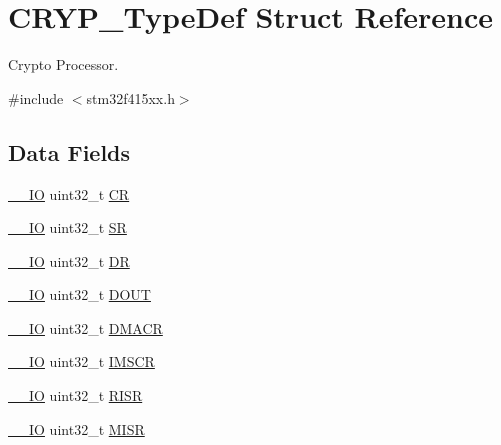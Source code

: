 \hypertarget{struct_c_r_y_p___type_def}{}\section{C\+R\+Y\+P\+\_\+\+Type\+Def Struct Reference}
\label{struct_c_r_y_p___type_def}


Crypto Processor.  




{\ttfamily \#include $<$stm32f415xx.\+h$>$}

\subsection*{Data Fields}
\begin{DoxyCompactItemize}
\item 
\hyperlink{core__sc300_8h_aec43007d9998a0a0e01faede4133d6be}{\+\_\+\+\_\+\+IO} uint32\+\_\+t \hyperlink{struct_c_r_y_p___type_def_ab40c89c59391aaa9d9a8ec011dd0907a}{CR}
\item 
\hyperlink{core__sc300_8h_aec43007d9998a0a0e01faede4133d6be}{\+\_\+\+\_\+\+IO} uint32\+\_\+t \hyperlink{struct_c_r_y_p___type_def_af6aca2bbd40c0fb6df7c3aebe224a360}{SR}
\item 
\hyperlink{core__sc300_8h_aec43007d9998a0a0e01faede4133d6be}{\+\_\+\+\_\+\+IO} uint32\+\_\+t \hyperlink{struct_c_r_y_p___type_def_a3df0d8dfcd1ec958659ffe21eb64fa94}{DR}
\item 
\hyperlink{core__sc300_8h_aec43007d9998a0a0e01faede4133d6be}{\+\_\+\+\_\+\+IO} uint32\+\_\+t \hyperlink{struct_c_r_y_p___type_def_ab8ba768d1dac54a845084bd07f4ef2b9}{D\+O\+UT}
\item 
\hyperlink{core__sc300_8h_aec43007d9998a0a0e01faede4133d6be}{\+\_\+\+\_\+\+IO} uint32\+\_\+t \hyperlink{struct_c_r_y_p___type_def_a082219a924d748e9c6092582aec06226}{D\+M\+A\+CR}
\item 
\hyperlink{core__sc300_8h_aec43007d9998a0a0e01faede4133d6be}{\+\_\+\+\_\+\+IO} uint32\+\_\+t \hyperlink{struct_c_r_y_p___type_def_adcdd7c23a99f81c21dae2e9f989632e1}{I\+M\+S\+CR}
\item 
\hyperlink{core__sc300_8h_aec43007d9998a0a0e01faede4133d6be}{\+\_\+\+\_\+\+IO} uint32\+\_\+t \hyperlink{struct_c_r_y_p___type_def_aa196fddf0ba7d6e3ce29bdb04eb38b94}{R\+I\+SR}
\item 
\hyperlink{core__sc300_8h_aec43007d9998a0a0e01faede4133d6be}{\+\_\+\+\_\+\+IO} uint32\+\_\+t \hyperlink{struct_c_r_y_p___type_def_a524e134cec519206cb41d0545e382978}{M\+I\+SR}

\end{DoxyCompactItemize}
